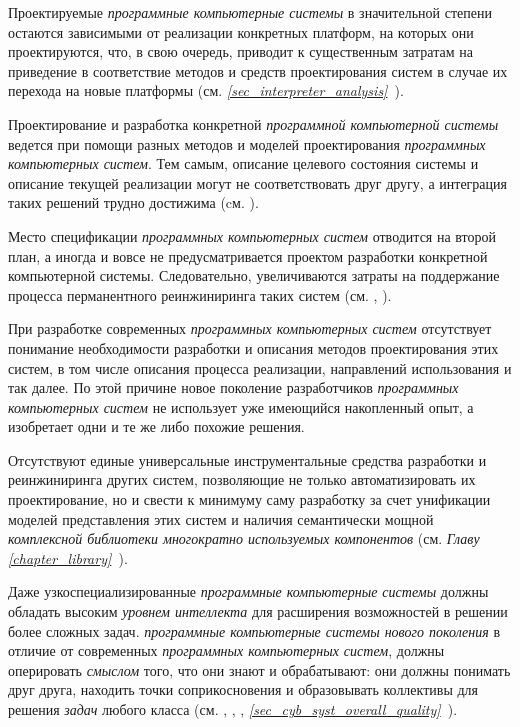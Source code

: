 \begin{textitemize}
   \item Проектируемые \textit{программные компьютерные системы} в значительной степени остаются зависимыми от реализации конкретных платформ, на которых они проектируются, что, в свою очередь, приводит к существенным затратам на приведение в соответствие методов и средств проектирования систем в случае их перехода на новые платформы (см. \textit{\ref{sec_interpreter_analysis}~}).
   \item Проектирование и разработка конкретной \textit{программной компьютерной системы} ведется при помощи разных методов и моделей проектирования \textit{программных компьютерных систем}. Тем самым, описание целевого состояния системы и описание текущей реализации могут не соответствовать друг другу, а интеграция таких решений трудно достижима (cм. ).
   \item Место спецификации \textit{программных компьютерных систем} отводится на второй план, а иногда и вовсе не предусматривается проектом разработки конкретной компьютерной системы. Следовательно, увеличиваются затраты на поддержание процесса перманентного реинжиниринга таких систем (см. , ).
   \item При разработке современных \textit{программных компьютерных систем} отсутствует понимание необходимости разработки и описания методов проектирования этих систем, в том числе описания процесса реализации, направлений использования и так далее. По этой причине новое поколение разработчиков \textit{программных компьютерных систем} не использует уже имеющийся накопленный опыт, а изобретает одни и те же либо похожие решения.
   \item Отсутствуют единые универсальные инструментальные средства разработки и реинжиниринга других систем, позволяющие не только автоматизировать их проектирование, но и свести к минимуму саму разработку за счет унификации моделей представления этих систем и наличия семантически мощной \textit{комплексной библиотеки многократно используемых компонентов} (см. \textit{Главу \ref{chapter_library}~}).
   \item Даже узкоспециализированные \textit{программные компьютерные системы} должны обладать высоким \textit{уровнем интеллекта} для расширения возможностей в решении более сложных задач. \textit{программные компьютерные системы нового поколения} в отличие от современных \textit{программных компьютерных систем}, должны оперировать \textit{смыслом} того, что они знают и обрабатывают: они должны понимать друг друга, находить точки соприкосновения и образовывать коллективы для решения \textit{задач} любого класса (см. , , , \textit{\ref{sec_cyb_syst_overall_quality}~}).

\end{textitemize}
